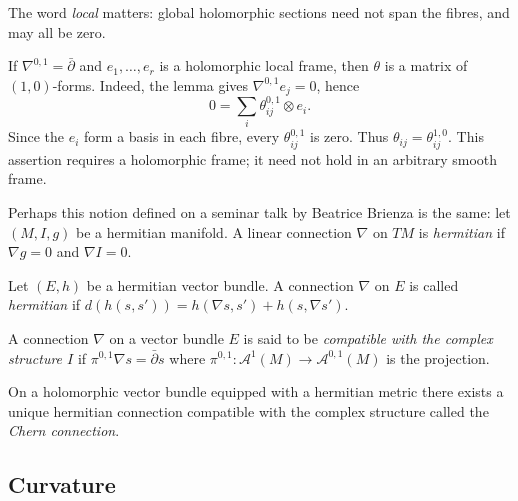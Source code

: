 \noindent
The word \emph{local} matters: global
holomorphic sections need not span
the fibres, and may all be zero.

\begin{remark}
\label{remark-connection-matrix-type}
If $\nabla^{0,1}=\bar\partial$ and
$e_1,\ldots,e_r$ is a holomorphic local
frame, then $\theta$ is a matrix of
$(1,0)$-forms. Indeed, the lemma gives
$\nabla^{0,1}e_j=0$, hence
$$
0=\sum_i\theta_{ij}^{0,1}\otimes e_i.
$$
Since the $e_i$ form a basis in each
fibre, every $\theta_{ij}^{0,1}$ is zero.
Thus $\theta_{ij}=\theta_{ij}^{1,0}$.
This assertion requires a holomorphic
frame; it need not hold in an arbitrary
smooth frame.
\end{remark}

\noindent
Perhaps this notion defined on a seminar
talk by Beatrice Brienza is the same:
let $(M,I,g)$ be a hermitian manifold. A
linear connection $\nabla$ on $TM$ is
{\it hermitian} if
$\nabla g=0$ and $\nabla I =0$.

\begin{definition}
\label{definition-hermitian-connection}
\begin{reference}
\cite[Definition 4.2.9]{huc}
\end{reference}
Let $(E,h)$ be a hermitian vector bundle.
A connection $\nabla$ on $E$ is called
{\it hermitian} if
$d(h(s,s'))=h(\nabla s,s')+h(s,\nabla s')$.
\end{definition}

\begin{definition}
\label{definition-holomorphic-connection}
A connection $\nabla$ on a vector bundle $E$
is said to be {\it compatible with the
complex structure $I$} if
$\pi^{0,1}\nabla s=\bar\partial s$
where $\pi^{0,1}:\mathcal{A}^1(M)
\to \mathcal{A}^{0,1}(M)$ is the projection.
\end{definition}

\begin{proposition}
\label{proposition-chern-connection}
On a holomorphic vector bundle
equipped with a hermitian metric there exists
a unique hermitian connection
compatible with the complex structure
called the {\it Chern connection}.
\end{proposition}

\subsection{Curvature}
\label{subsection-curvature}

